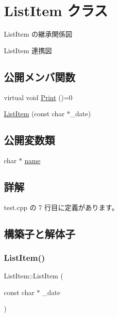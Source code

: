 \hypertarget{class_list_item}{}\section{List\+Item クラス}
\label{class_list_item}


List\+Item の継承関係図


List\+Item 連携図
\subsection*{公開メンバ関数}
\begin{DoxyCompactItemize}
\item 
virtual void \hyperlink{class_list_item_a0bb35843489312a6796d6f94f4395399}{Print} ()=0
\item 
\hyperlink{class_list_item_a19fe16421201217d9c0647865243c07b}{List\+Item} (const char $\ast$\+\_\+date)
\end{DoxyCompactItemize}
\subsection*{公開変数類}
\begin{DoxyCompactItemize}
\item 
char $\ast$ \hyperlink{class_list_item_a721391bcdefb1a5f77b79295a80b0305}{name}
\end{DoxyCompactItemize}


\subsection{詳解}


 test.\+cpp の 7 行目に定義があります。



\subsection{構築子と解体子}
\mbox{\label{class_list_item_a19fe16421201217d9c0647865243c07b}} 
\subsubsection{\texorpdfstring{List\+Item()}{ListItem()}}
{\footnotesize\ttfamily List\+Item\+::\+List\+Item (\begin{DoxyParamCaption}\item[{const char $\ast$}]{\+\_\+date }\end{DoxyParamCaption})\hspace{0.3cm}{\ttfamily [inline]}}



